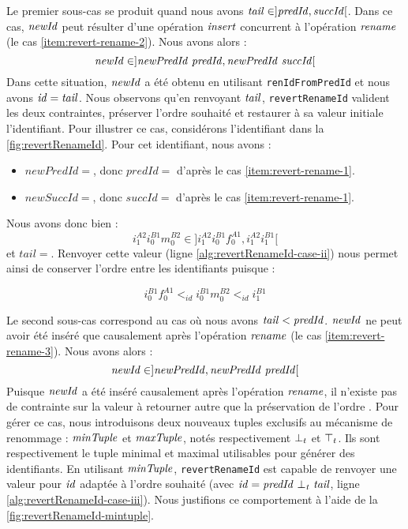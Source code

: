Le premier sous-cas se produit quand nous avons $\mathit{tail} \in ]\mathit{predId}, \mathit{succId}[$.
Dans ce cas, $\mathit{newId}$ peut résulter d'une opération $\mathit{insert}$ concurrent à l'opération $\mathit{rename}$ (\ie le cas \ref{item:revert-rename-2}).
Nous avons alors :
\[\mathit{newId} \in ]\mathit{newPredId~predId}, \mathit{newPredId~succId}[\]
Dans cette situation, $\mathit{newId}$ a été obtenu en utilisant \texttt{renIdFromPredId} et nous avons $\mathit{id} = \mathit{tail}$.
Nous observons qu'en renvoyant $\mathit{tail}$, \texttt{revertRenameId} valident les deux contraintes, \ie préserver l'ordre souhaité et restaurer à sa valeur initiale l'identifiant.
Pour illustrer ce cas, considérons l'identifiant  dans la \autoref{fig:revertRenameId}.
Pour cet identifiant, nous avons :
\begin{itemize}
  \item $newPredId = $, donc $predId = $ d'après le cas \ref{item:revert-rename-1}.
  \item $newSuccId = $, donc $succId = $ d'après le cas \ref{item:revert-rename-1}.
\end{itemize}
Nous avons donc bien :
\[i^{A2}_{1}i^{B1}_{0}m^{B2}_{0} \in ]i^{A2}_{1}i^{B1}_{0}f^{A1}_{0}, i^{A2}_{1}i^{B1}_{1}[\]
et $tail = $.
Renvoyer cette valeur (ligne \ref{alg:revertRenameId-case-ii}) nous permet ainsi de conserver l'ordre entre les identifiants puisque :

\[i^{B1}_{0}f^{A1}_{0} <_{id} i^{B1}_{0}m^{B2}_{0} <_{id} i^{B1}_{1}\]

Le second sous-cas correspond au cas où nous avons $\mathit{tail} < \mathit{predId}$.
$\mathit{newId}$ ne peut avoir été inséré que causalement après l'opération $\mathit{rename}$ (\ie le cas \ref{item:revert-rename-3}).
Nous avons alors :
\[\mathit{newId} \in ]\mathit{newPredId}, \mathit{newPredId~predId}[\]
Puisque $\mathit{newId}$ a été inséré causalement après l'opération $\mathit{rename}$, il n'existe pas de contrainte sur la valeur à retourner autre que la préservation de l'ordre .
Pour gérer ce cas, nous introduisons deux nouveaux tuples exclusifs au mécanisme de renommage : $\mathit{minTuple}$ et $\mathit{maxTuple}$, notés respectivement $\bot_t$ et $\top_t$.
Ils sont respectivement le tuple minimal et maximal utilisables pour générer des identifiants.
En utilisant $\mathit{minTuple}$, \texttt{revertRenameId} est capable de renvoyer une valeur pour $\mathit{id}$ adaptée à l'ordre souhaité (avec $\mathit{id} = \mathit{predId~\bot_t~tail}$, ligne \ref{alg:revertRenameId-case-iii}).
Nous justifions ce comportement à l'aide de la \autoref{fig:revertRenameId-mintuple}.

